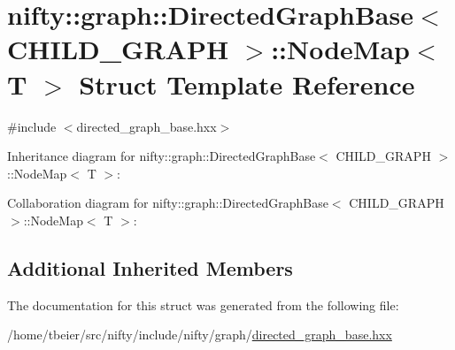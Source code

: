\hypertarget{structnifty_1_1graph_1_1DirectedGraphBase_1_1NodeMap}{}\section{nifty\+:\+:graph\+:\+:Directed\+Graph\+Base$<$ C\+H\+I\+L\+D\+\_\+\+G\+R\+A\+P\+H $>$\+:\+:Node\+Map$<$ T $>$ Struct Template Reference}
\label{structnifty_1_1graph_1_1DirectedGraphBase_1_1NodeMap}


{\ttfamily \#include $<$directed\+\_\+graph\+\_\+base.\+hxx$>$}



Inheritance diagram for nifty\+:\+:graph\+:\+:Directed\+Graph\+Base$<$ C\+H\+I\+L\+D\+\_\+\+G\+R\+A\+P\+H $>$\+:\+:Node\+Map$<$ T $>$\+:


Collaboration diagram for nifty\+:\+:graph\+:\+:Directed\+Graph\+Base$<$ C\+H\+I\+L\+D\+\_\+\+G\+R\+A\+P\+H $>$\+:\+:Node\+Map$<$ T $>$\+:
\subsection*{Additional Inherited Members}


The documentation for this struct was generated from the following file\+:\begin{DoxyCompactItemize}
\item 
/home/tbeier/src/nifty/include/nifty/graph/\hyperlink{directed__graph__base_8hxx}{directed\+\_\+graph\+\_\+base.\+hxx}\end{DoxyCompactItemize}
